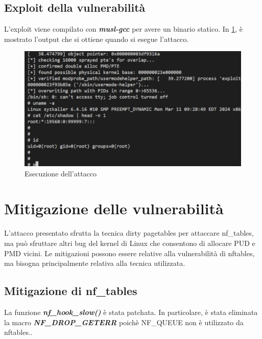\documentclass{article}
\begin{document}
\subsection{Exploit della vulnerabilità}
L'exploit viene compilato con \textbf{\textit{musl-gcc}} per avere un binario statico. 
In \cref{fig:exploit}, è mostrato l'output che si ottiene quando si esegue l'attacco.
\begin{figure}[h]
  \begin{center}
    \includegraphics[width=.65\textwidth]{figures/ch2/exploit.png}
  \end{center}
  \caption{Esecuzione dell'attacco}\label{fig:exploit}
\end{figure}


\clearpage

\section{Mitigazione delle vulnerabilità}
L'attacco presentato sfrutta la tecnica dirty pagetables per attaccare nf\_tables, ma 
può sfruttare altri bug del kernel di Linux che consentono di allocare PUD e PMD vicini. Le 
mitigazioni possono essere relative alla vulnerabilità di nftables, ma bisogna principalmente
relativa alla tecnica utilizzata.

\subsection{Mitigazione di nf\_tables}
La funzione \textbf{\textit{nf\_hook\_slow()}} è stata patchata. In particolare, è stata 
eliminata la macro \textbf{\textit{NF\_DROP\_GETERR}} poichè NF\_QUEUE non è utilizzato da 
nftables.\cite{Patch}.
\end{document}

